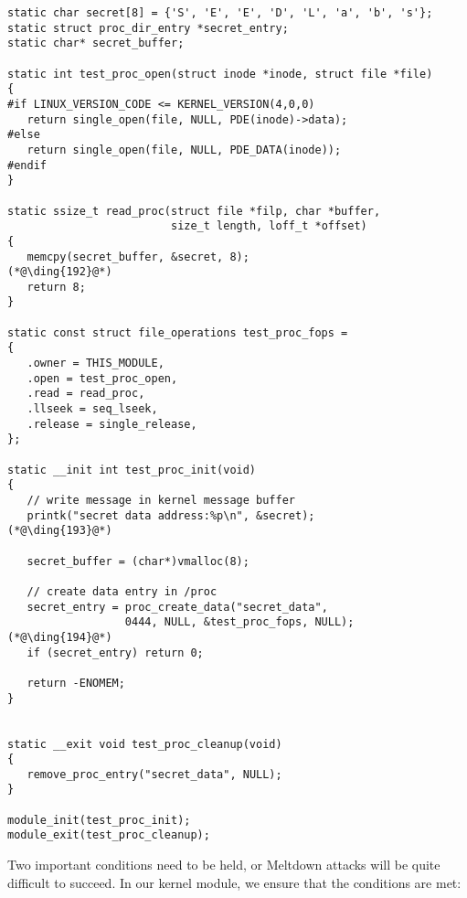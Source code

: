\begin{lstlisting}[caption=\texttt{MeltdownKernel.c}, label=meltdown:list:kernelmodule]
static char secret[8] = {'S', 'E', 'E', 'D', 'L', 'a', 'b', 's'};
static struct proc_dir_entry *secret_entry;
static char* secret_buffer;

static int test_proc_open(struct inode *inode, struct file *file)
{
#if LINUX_VERSION_CODE <= KERNEL_VERSION(4,0,0)
   return single_open(file, NULL, PDE(inode)->data);
#else
   return single_open(file, NULL, PDE_DATA(inode));
#endif
}

static ssize_t read_proc(struct file *filp, char *buffer, 
                         size_t length, loff_t *offset)
{
   memcpy(secret_buffer, &secret, 8);                  (*@\ding{192}@*)
   return 8;
}

static const struct file_operations test_proc_fops =
{
   .owner = THIS_MODULE,
   .open = test_proc_open,
   .read = read_proc,
   .llseek = seq_lseek,
   .release = single_release,
};

static __init int test_proc_init(void)
{
   // write message in kernel message buffer
   printk("secret data address:%p\n", &secret);        (*@\ding{193}@*)

   secret_buffer = (char*)vmalloc(8);

   // create data entry in /proc
   secret_entry = proc_create_data("secret_data", 
                  0444, NULL, &test_proc_fops, NULL);  (*@\ding{194}@*)
   if (secret_entry) return 0;

   return -ENOMEM;
}


static __exit void test_proc_cleanup(void)
{
   remove_proc_entry("secret_data", NULL);
}

module_init(test_proc_init);
module_exit(test_proc_cleanup);
\end{lstlisting}


Two important conditions need to be held, or Meltdown attacks will be quite difficult to
succeed. In our kernel module, we ensure that the conditions are met:

